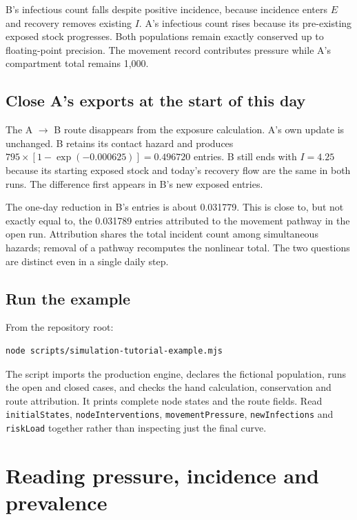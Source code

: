 \documentclass[11pt,a4paper]{article}
\begin{document}
B's infectious count falls despite positive incidence, because incidence
enters \(E\) and recovery removes existing \(I\). A's infectious count
rises because its pre-existing exposed stock progresses. Both
populations remain exactly conserved up to floating-point precision. The
movement record contributes pressure while A's compartment total remains
1,000.

\subsection{Close A's exports at the start of this
day}\label{close-as-exports-at-the-start-of-this-day}

The A \ensuremath{\rightarrow} B route disappears from the exposure calculation. A's own update
is unchanged. B retains its contact hazard and produces
\(795 \times  [1-\exp(-0.000625)] = 0.496720\) entries. B still ends
with \(I = 4.25\) because its starting exposed stock and today's
recovery flow are the same in both runs. The difference first appears in
B's new exposed entries.

The one-day reduction in B's entries is about 0.031779. This is close
to, but not exactly equal to, the 0.031789 entries attributed to the
movement pathway in the open run. Attribution shares the total incident
count among simultaneous hazards; removal of a pathway recomputes the
nonlinear total. The two questions are distinct even in a single daily
step.

\subsection{Run the example}\label{run-the-example}

From the repository root:

\begin{verbatim}
node scripts/simulation-tutorial-example.mjs
\end{verbatim}

The script imports the production engine, declares the fictional
population, runs the open and closed cases, and checks the hand
calculation, conservation and route attribution. It prints complete node
states and the route fields. Read \nolinkurl{initialStates},
\nolinkurl{nodeInterventions}, \nolinkurl{movementPressure},
\nolinkurl{newInfections} and \nolinkurl{riskLoad} together rather than
inspecting just the final curve.

\section{Reading pressure, incidence and
prevalence}\label{reading-pressure-incidence-and-prevalence}
\end{document}
